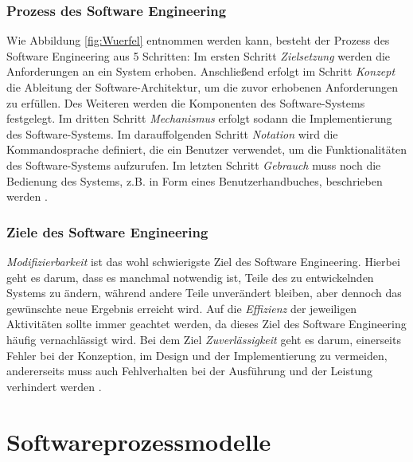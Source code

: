  \subsubsection{Prozess des Software Engineering}

Wie Abbildung  \ref{fig:Wuerfel} entnommen werden kann, besteht der Prozess des Software Engineering aus 5 Schritten: Im ersten Schritt \textit{Zielsetzung} werden die Anforderungen an ein System erhoben. Anschließend erfolgt im Schritt \textit{Konzept} die Ableitung der Software-Architektur, um die zuvor erhobenen Anforderungen zu erfüllen. Des Weiteren werden die Komponenten des Software-Systems festgelegt. Im dritten Schritt \textit {Mechanismus} erfolgt sodann die Implementierung des Software-Systems. Im darauffolgenden Schritt \textit{Notation} wird die Kommandosprache definiert, die ein Benutzer verwendet, um die Funktionalitäten des Software-Systems aufzurufen. Im letzten Schritt \textit{Gebrauch} muss noch die Bedienung des Systems, z.B. in Form eines Benutzerhandbuches, beschrieben werden \cite{ross1975software}.

  \subsubsection{Ziele des Software Engineering}

\textit{Modifizierbarkeit} ist das wohl schwierigste Ziel des Software Engineering. Hierbei geht es darum, dass es manchmal notwendig ist, Teile des zu entwickelnden Systems zu ändern, während andere Teile unverändert bleiben, aber dennoch das gewünschte neue Ergebnis erreicht wird. Auf die \textit{Effizienz} der jeweiligen Aktivitäten sollte immer geachtet werden, da dieses Ziel des Software Engineering häufig vernachlässigt wird. Bei dem Ziel \textit{Zuverlässigkeit} geht es darum, einerseits Fehler bei der Konzeption, im Design und der Implementierung zu vermeiden, andererseits muss auch Fehlverhalten bei der Ausführung und der Leistung verhindert werden \cite{ross1975software}.
 
\section{Softwareprozessmodelle}\label{sec:chapter.2: Softwareprozessmodelle}

